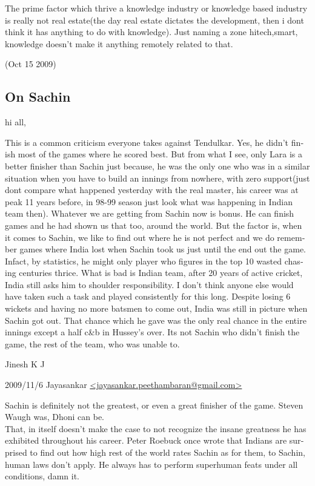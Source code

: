 \begin{english}
The prime factor which thrive a knowledge industry or knowledge based industry is really not real estate(the day real estate dictates the development, then i dont think it has anything to do with knowledge). Just naming a zone hitech,smart, knowledge doesn't make it anything remotely related to that.

\begin{flushright}(Oct 15 2009)\end{flushright}

\subsection*{On Sachin}

hi all,

This is a common criticism everyone takes against Tendulkar. Yes, he didn't finish most of the games where he scored best. But from what I see, only Lara is a better finisher than Sachin just because, he was the only one who was in a similar situation when you have to build an innings from nowhere, with zero support(just dont compare what happened yesterday with the real master, his career was at peak 11 years before, in 98-99 season just look what was happening in Indian team then). Whatever we are getting from Sachin now is bonus. He can finish games and he had shown us that too, around the world. But the factor is, when it comes to Sachin, we like to find out where he is not perfect and we do remember games where India lost when Sachin took us just until the end out the game. Infact, by statistics, he might only player who figures in the top 10 wasted chasing centuries thrice. What is bad is Indian team, after 20 years of active cricket, India still asks him to shoulder responsibility. I don't think anyone else would have taken such a task and played consistently for  this long. Despite losing 6 wickets and having no more batsmen to come out, India was still in picture when Sachin got out. That chance which he gave was the only real chance in the entire innings except a half c\&b in Hussey's over. Its not Sachin who didn't finish the game, the rest of the team, who was unable to.

Jinesh K J

2009/11/6 Jayasankar \url{<jayasankar.peethambaran@gmail.com>}

    Sachin is definitely not the greatest, or even a great finisher of the game. Steven Waugh was, Dhoni can be.\\

    That, in itself doesn't make the case to not recognize the insane greatness he has exhibited throughout his career. Peter Roebuck once wrote that Indians are surprised to find out how high rest of the world rates Sachin as for them, to Sachin, human laws don't apply. He always has to perform superhuman feats under all conditions, damn it.


\end{english}
